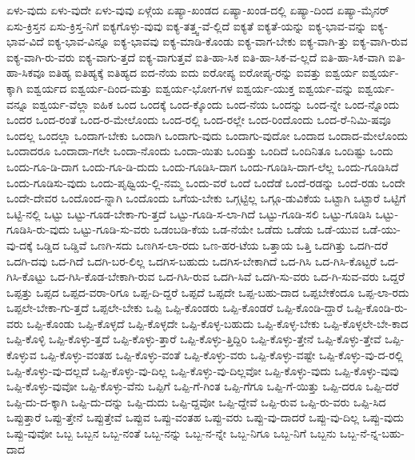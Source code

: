 {ಏಳು-ವುದು
ಏಳು-ವುದೇ
ಏಳು-ವುವು
ಏಳ್ಗೆಯ
ಏಷ್ಯಾ-ಖಂಡದ
ಏಷ್ಯಾ-ಖಂಡ-ದಲ್ಲಿ
ಏಷ್ಯಾ-ದಿಂದ
ಏಷ್ಯಾ-ಮೈನರ್
ಏಸು-ಕ್ರಿಸ್ತನ
ಏಸು-ಕ್ರಿಸ್ತ-ನಿಗೆ
ಐಕ್ಯಗೊಳ್ಳು-ವುವು
ಐಕ್ಯ-ತತ್ತ್ವ-ವೆ-ಲ್ಲಿದೆ
ಐಕ್ಯತೆ
ಐಕ್ಯತೆ-ಯನ್ನು
ಐಕ್ಯ-ಭಾವ-ವನ್ನು
ಐಕ್ಯ-ಭಾವ-ವಿದೆ
ಐಕ್ಯ-ಭಾವ-ವಿನ್ನೂ
ಐಕ್ಯ-ಭಾವವು
ಐಕ್ಯ-ಮಾಡಿ-ಕೊಂಡು
ಐಕ್ಯ-ವಾಗ-ಬೇಕು
ಐಕ್ಯ-ವಾಗಿ-ತ್ತು
ಐಕ್ಯ-ವಾಗಿ-ರುವ
ಐಕ್ಯ-ವಾಗಿ-ರು-ವರು
ಐಕ್ಯ-ವಾಗು-ತ್ತದೆ
ಐಕ್ಯ-ವಾಗುತ್ತವೆ
ಐತಿ-ಹಾ-ಸಿಕ
ಐತಿ-ಹಾ-ಸಿಕ-ವ-ಲ್ಲದೆ
ಐತಿ-ಹಾ-ಸಿಕ-ವಾಗಿ
ಐತಿ-ಹಾ-ಸಿಕವೂ
ಐತಿಹ್ಯ
ಐತಿಹ್ಯಕ್ಕೆ
ಐತಿಹ್ಯದ
ಐದ-ನೆಯ
ಐದು
ಐರೋಪ್ಯ
ಐರೋಪ್ಯ-ರನ್ನು
ಐವತ್ತು
ಐಶ್ವರ್ಯ
ಐಶ್ವರ್ಯ-ಕ್ಕಾಗಿ
ಐಶ್ವರ್ಯದ
ಐಶ್ವರ್ಯ-ದಿಂದ-ಮತ್ತು
ಐಶ್ವರ್ಯ-ಭೋಗ-ಗಳ
ಐಶ್ವರ್ಯ-ಯುಕ್ತ
ಐಶ್ವರ್ಯ-ವನ್ನು
ಐಶ್ವರ್ಯ-ವನ್ನೂ
ಐಶ್ವರ್ಯ-ವೆಲ್ಲಾ
ಐಹಿಕ
ಒಂದ
ಒಂದಕ್ಕೆ
ಒಂದ-ಕ್ಕೊಂದು
ಒಂದ-ನೆಯ
ಒಂದನ್ನು
ಒಂದ-ನ್ನೇ
ಒಂದ-ನ್ನೊಂದು
ಒಂದರ
ಒಂದ-ರಂತೆ
ಒಂದ-ರ-ಮೇಲೊಂದು
ಒಂದ-ರಲ್ಲಿ
ಒಂದ-ರಲ್ಲೇ
ಒಂದ-ರಿಂದೊಂದು
ಒಂದ-ರೆ-ನಿಮಿ-ಷವೂ
ಒಂದಲ್ಲ
ಒಂದಲ್ಲಾ
ಒಂದಾಗ-ಬೇಕು
ಒಂದಾಗಿ
ಒಂದಾಗು-ವುದು
ಒಂದಾಗು-ವುದೋ
ಒಂದಾದ
ಒಂದಾದ-ಮೇಲೊಂದು
ಒಂದಾದರೂ
ಒಂದಾದಾ-ಗಲೇ
ಒಂದಾ-ನೊಂದು
ಒಂದಾ-ಯಿತು
ಒಂದಿತ್ತು
ಒಂದಿದೆ
ಒಂದಿನಿತೂ
ಒಂದಿಷ್ಟು
ಒಂದು
ಒಂದು-ಗೂ-ಡಿ-ದಾಗ
ಒಂದು-ಗೂ-ಡಿ-ದುದು
ಒಂದು-ಗೂಡಿಸಿ-ದಾಗ
ಒಂದು-ಗೂಡಿಸಿ-ದಾಗ-ಲೆಲ್ಲ
ಒಂದು-ಗೂಡಿಸಿದೆ
ಒಂದು-ಗೂಡಿಸು-ವುದು
ಒಂದು-ಪೃಥ್ವಿಯ-ಲ್ಲಿ-ನಮ್ಮ
ಒಂದು-ವರೆ
ಒಂದೆ
ಒಂದೆಡೆ
ಒಂದೆ-ರಡನ್ನು
ಒಂದೆ-ರಡು
ಒಂದೇ
ಒಂದೇ-ದೇವರ
ಒಂದೊಂದ-ನ್ನಾಗಿ
ಒಂದೊಂದು
ಒಗೆಯ-ಬೇಕು
ಒಗ್ಗಟ್ಟಿಲ್ಲ
ಒಗ್ಗೂ-ಡುವಿಕೆಯ
ಒಟ್ಟಾಗಿ
ಒಟ್ಟಾರೆ
ಒಟ್ಟಿಗೆ
ಒಟ್ಟಿ-ನಲ್ಲಿ
ಒಟ್ಟು
ಒಟ್ಟು-ಗೂಡ-ಬೇಕಾ-ಗು-ತ್ತದೆ
ಒಟ್ಟು-ಗೂಡಿ-ಸ-ಲಾ-ಗಿದೆ
ಒಟ್ಟು-ಗೂಡಿ-ಸಲಿ
ಒಟ್ಟು-ಗೂಡಿಸಿ
ಒಟ್ಟು-ಗೂಡಿಸಿ-ರು-ವುದು
ಒಟ್ಟು-ಗೂಡಿ-ಸು-ವರು
ಒಡಂಬಡಿ-ಕೆಯ
ಒಡ-ನೆಯೇ
ಒಡೆದು
ಒಡೆಯ
ಒಡೆ-ಯುವ
ಒಡೆ-ಯು-ವು-ದಕ್ಕೆ
ಒಡ್ಡಿದ
ಒಡ್ಡಿವೆ
ಒಣಗಿ-ಸದು
ಒಣಗಿಸ-ಲಾ-ರದು
ಒಣ-ಹರ-ಟೆಯ
ಒತ್ತಾಯ
ಒತ್ತಿ
ಒದಗಿತ್ತು
ಒದಗಿ-ದರೆ
ಒದಗಿ-ದವು
ಒದ-ಗಿದೆ
ಒದಗಿ-ಬರ-ಲಿಲ್ಲ
ಒದಗಿಸ-ಬಹುದು
ಒದಗಿಸ-ಬೇಕಾಗಿದೆ
ಒದ-ಗಿಸಿ
ಒದ-ಗಿಸಿ-ಕೊಟ್ಟರೆ
ಒದ-ಗಿಸಿ-ಕೊಟ್ಟು
ಒದ-ಗಿಸಿ-ಕೊಡ-ಬೇಕಾಗಿ-ರುವ
ಒದ-ಗಿಸಿ-ರುವ
ಒದಗಿ-ಸಿವೆ
ಒದಗಿ-ಸು-ವರು
ಒದ-ಗಿ-ಸುವ-ವರು
ಒದ್ದರೆ
ಒಪ್ಪತ್ತು
ಒಪ್ಪದ
ಒಪ್ಪದ-ವರಾ-ರಿಗೂ
ಒಪ್ಪ-ದಿ-ದ್ದರೆ
ಒಪ್ಪದೆ
ಒಪ್ಪದೇ
ಒಪ್ಪ-ಬಹು-ದಾದ
ಒಪ್ಪಬೇಕೆಂದೂ
ಒಪ್ಪ-ಲಾ-ರದು
ಒಪ್ಪಲೇ-ಬೇಕಾ-ಗು-ತ್ತದೆ
ಒಪ್ಪಲೇ-ಬೇಕು
ಒಪ್ಪಿ
ಒಪ್ಪಿ-ಕೊಂಡರು
ಒಪ್ಪಿ-ಕೊಂಡರೆ
ಒಪ್ಪಿ-ಕೊಂಡಿ-ದ್ದಾರೆ
ಒಪ್ಪಿ-ಕೊಂಡಿ-ರು-ವರು
ಒಪ್ಪಿ-ಕೊಂಡು
ಒಪ್ಪಿ-ಕೊಳ್ಳದೆ
ಒಪ್ಪಿ-ಕೊಳ್ಳದೇ
ಒಪ್ಪಿ-ಕೊಳ್ಳ-ಬಹುದು
ಒಪ್ಪಿ-ಕೊಳ್ಳ-ಬೇಕು
ಒಪ್ಪಿ-ಕೊಳ್ಳಲೇ-ಬೇ-ಕಾದ
ಒಪ್ಪಿ-ಕೊಳ್ಳಿ
ಒಪ್ಪಿ-ಕೊಳ್ಳು-ತ್ತದೆ
ಒಪ್ಪಿ-ಕೊಳ್ಳು-ತ್ತಾರೆ
ಒಪ್ಪಿ-ಕೊಳ್ಳು-ತ್ತಿದ್ದಿರಿ
ಒಪ್ಪಿ-ಕೊಳ್ಳು-ತ್ತೇನೆ
ಒಪ್ಪಿ-ಕೊಳ್ಳು-ತ್ತೇವೆ
ಒಪ್ಪಿ-ಕೊಳ್ಳುವ
ಒಪ್ಪಿ-ಕೊಳ್ಳು-ವಂತಹ
ಒಪ್ಪಿ-ಕೊಳ್ಳು-ವಂತೆ
ಒಪ್ಪಿ-ಕೊಳ್ಳು-ವರು
ಒಪ್ಪಿ-ಕೊಳ್ಳು-ವಷ್ಟೇ
ಒಪ್ಪಿ-ಕೊಳ್ಳು-ವು-ದ-ರಲ್ಲಿ
ಒಪ್ಪಿ-ಕೊಳ್ಳು-ವು-ದಲ್ಲದೆ
ಒಪ್ಪಿ-ಕೊಳ್ಳು-ವು-ದಿಲ್ಲ
ಒಪ್ಪಿ-ಕೊಳ್ಳು-ವು-ದಿಲ್ಲವೋ
ಒಪ್ಪಿ-ಕೊಳ್ಳು-ವುದು
ಒಪ್ಪಿ-ಕೊಳ್ಳು-ವುವು
ಒಪ್ಪಿ-ಕೊಳ್ಳು-ವುವೋ
ಒಪ್ಪಿ-ಕೊಳ್ಳು-ವೆನು
ಒಪ್ಪಿಗೆ
ಒಪ್ಪಿ-ಗೆ-ಗಿಂತ
ಒಪ್ಪಿ-ಗೆಗೂ
ಒಪ್ಪಿ-ಗೆ-ಯಿತ್ತು
ಒಪ್ಪಿ-ದರೂ
ಒಪ್ಪಿ-ದರೆ
ಒಪ್ಪಿ-ದು-ದ-ಕ್ಕಾಗಿ
ಒಪ್ಪಿ-ದು-ದನ್ನು
ಒಪ್ಪಿ-ದುದು
ಒಪ್ಪಿ-ದ್ದವೋ
ಒಪ್ಪಿ-ದ್ದೇವೆ
ಒಪ್ಪಿ-ರುವ
ಒಪ್ಪಿ-ರು-ವರು
ಒಪ್ಪಿ-ಸಿದ
ಒಪ್ಪುತ್ತಾರೆ
ಒಪ್ಪು-ತ್ತೇನೆ
ಒಪ್ಪುತ್ತೇವೆ
ಒಪ್ಪುವ
ಒಪ್ಪು-ವಂತಹ
ಒಪ್ಪು-ವರು
ಒಪ್ಪು-ವು-ದಾದರೆ
ಒಪ್ಪು-ವು-ದಿಲ್ಲ
ಒಪ್ಪು-ವುದು
ಒಪ್ಪು-ವುವೋ
ಒಬ್ಬ
ಒಬ್ಬನ
ಒಬ್ಬ-ನಂತೆ
ಒಬ್ಬ-ನನ್ನು
ಒಬ್ಬ-ನ-ನ್ನೇ
ಒಬ್ಬ-ನಿಗೂ
ಒಬ್ಬ-ನಿಗೆ
ಒಬ್ಬನು
ಒಬ್ಬ-ನೆ-ನ್ನ-ಬಹು-ದಾದ
}
